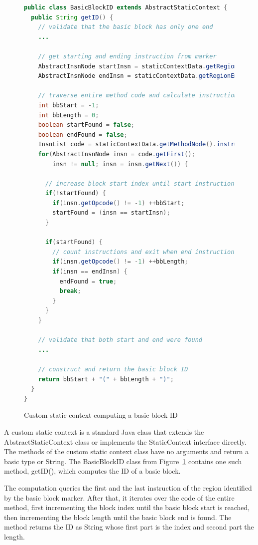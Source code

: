 \documentclass{article}
\newcommand{\brcode}[1]{\textsf{#1}}
\newcommand{\code}[1]{\mbox{\brcode{#1}}}
\begin{document}
\begin{figure}[h!]
\smaller
\begin{lstlisting}[language=Java]
public class BasicBlockID extends AbstractStaticContext {
  public String getID() {
    // validate that the basic block has only one end
    ...

    // get starting and ending instruction from marker
    AbstractInsnNode startInsn = staticContextData.getRegionStart();
    AbstractInsnNode endInsn = staticContextData.getRegionEnds().get(0);

    // traverse entire method code and calculate instruction index
    int bbStart = -1;
    int bbLength = 0;
    boolean startFound = false;
    boolean endFound = false;
    InsnList code = staticContextData.getMethodNode().instructions;
    for(AbstractInsnNode insn = code.getFirst();
        insn != null; insn = insn.getNext()) {

      // increase block start index until start instruction found
      if(!startFound) {
        if(insn.getOpcode() != -1) ++bbStart;
        startFound = (insn == startInsn);
      }

      if(startFound) {
        // count instructions and exit when end instruction found
        if(insn.getOpcode() != -1) ++bbLength;
        if(insn == endInsn) {
          endFound = true;
          break;
        }
      }
    }

    // validate that both start and end were found
    ...

    // construct and return the basic block ID
    return bbStart + "(" + bbLength + ")";
  }
}
\end{lstlisting}
\caption{Custom static context computing a basic block ID}
\label{fig:instr-prof-csc}
\end{figure}

A custom static context is a standard Java class that extends the \code{AbstractStaticContext} class or implements the \code{StaticContext} interface directly.
The methods of the custom static context class have no arguments and return a basic type or \code{String}.
The \code{BasicBlockID} class from Figure~\ref{fig:instr-prof-csc} contains one such method, \code{getID()}, which computes the ID of a basic block.

The computation queries the first and the last instruction of the region identified by the basic block marker.
After that, it iterates over the code of the entire method, first incrementing the block index until the basic block start is reached, then incrementing the block length until the basic block end is found.
The method returns the ID as \code{String} whose first part is the index and second part the length.
\end{document}
